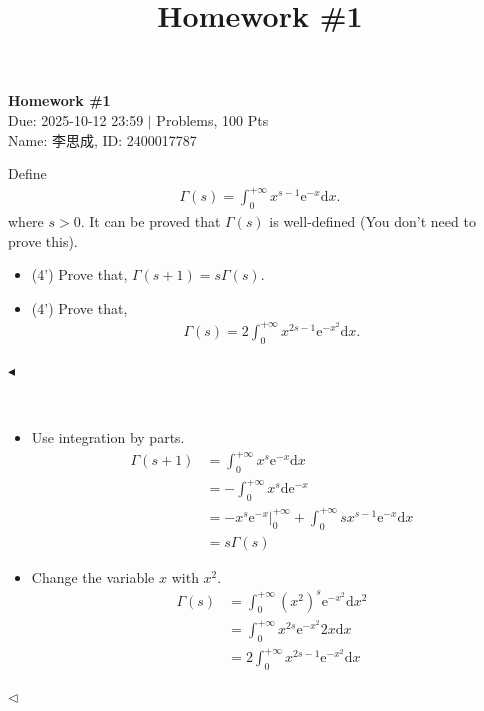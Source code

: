 \documentclass[11pt]{article}
\title{Homework \#1}
\newenvironment{problem}[2][Problem]{\begin{trivlist}
\item[\hskip \labelsep {\bfseries #1}\hskip \labelsep {\bfseries #2.}]}{\hfill$\blacktriangleleft$\end{trivlist}}
\newenvironment{answer}[1][Answer]{\begin{trivlist}
\item[\hskip \labelsep {\bfseries #1.}\hskip \labelsep]}{\hfill$\lhd$\end{trivlist}}
\newcommand\dd{\mathrm{d}}
\newcommand\e{\mathrm{e}}
\begin{document}
\pagestyle{fancy}
\chead{}

\begin{center}
    {\LARGE \bf Homework \#1}\\
    {Due: 2025-10-12 23:59 \quad$|$ Problems, 100 Pts}\\
    {Name: 李思成, ID: 2400017787}            %
\end{center}



\begin{problem}{1 (8')}
Define
\begin{align*}
    \Gamma(s) = \int_{0}^{+\infty} x^{s - 1} \mathrm{e}^{-x} \mathrm{d}x.
\end{align*}
where $s>0$. It can be proved that $\Gamma(s)$ is well-defined (You don't need to prove this).
\begin{itemize}
    \item [(1)] (4') Prove that, $\Gamma(s+1)=s\Gamma(s)$.
    \item [(2)] (4') Prove that,
    \begin{align*}
        \Gamma(s)=2\int_{0}^{+\infty}x^{2s-1}\mathrm{e}^{-x^2}\mathrm{d}x.
    \end{align*}
\end{itemize}
\end{problem}

\begin{answer} ~
\begin{itemize}
    \item [(1)] Use integration by parts.
    \[\begin{aligned}
        \Gamma(s + 1) &= \int_0^{+\infty} x^s {\e}^{-x} \dd x \\
            &= -\int_0^{+\infty} x^s \dd {\e}^{-x} \\
            &= -x^s {\e}^{-x} \Big|_0^{+\infty} + \int_{0}^{+\infty} sx^{s - 1} \mathrm{e}^{-x} \mathrm{d}x \\
            &= s\Gamma(s) 
    \end{aligned}\]
    \item [(2)] Change the variable $x$ with $x^2$.
    \[\begin{aligned}
        \Gamma(s) &= \int_0^{+\infty} (x^2)^s {\e}^{-x^2} \dd x^2 \\
        &= \int_0^{+\infty} x^{2s} {\e}^{-x^2} 2x\dd x \\
        &= 2\int_0^{+\infty} x^{2s - 1} {\e}^{-x^2} \dd x
    \end{aligned}\]
\end{itemize}
\end{answer}
\end{document}
